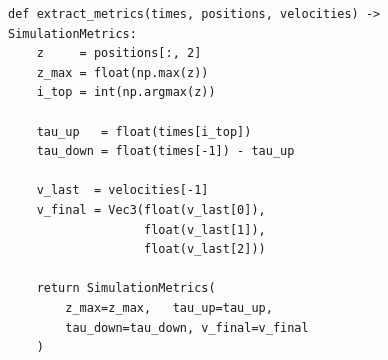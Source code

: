 \begin{lstlisting}[caption={Extração de métricas a partir dos arrays simulados}, label={lst:metrics}]
def extract_metrics(times, positions, velocities) -> SimulationMetrics:
    z     = positions[:, 2]
    z_max = float(np.max(z))
    i_top = int(np.argmax(z))

    tau_up   = float(times[i_top])
    tau_down = float(times[-1]) - tau_up

    v_last  = velocities[-1]
    v_final = Vec3(float(v_last[0]),
                   float(v_last[1]),
                   float(v_last[2]))

    return SimulationMetrics(
        z_max=z_max,   tau_up=tau_up,
        tau_down=tau_down, v_final=v_final
    )
\end{lstlisting}
